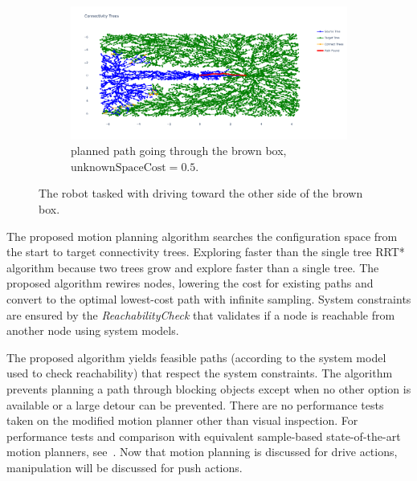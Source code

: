 \begin{figure}[H]
    \begin{subfigure}{1.11\textwidth}
    \centering
    \includegraphics[width=\textwidth]{figures/required_background/mp/mp_low_fixed_cost}
    \caption{planned path going through the brown box, $\textrm{unknownSpaceCost} = 0.5$.}
    \end{subfigure}
    \caption{The robot tasked with driving toward the other side of the brown box.}%
    \label{fig:mp_push_or_drive}
\end{figure}


The  proposed motion planning algorithm searches the configuration space from the start to target connectivity trees. Exploring faster than the single tree \ac{RRT*} algorithm  because two trees grow and explore faster than a single tree. The proposed algorithm rewires nodes, lowering the cost for existing paths and convert to the optimal lowest-cost path with infinite sampling. System constraints are ensured by the \textit{ReachabilityCheck} that validates if a node is reachable from another node using system models.\bs


The proposed algorithm yields feasible paths (according to the system model used to check reachability) that respect the system constraints. The algorithm prevents planning a path through blocking objects except when no other option is available or a large detour can be prevented. There are no performance tests taken on the modified motion planner other than visual inspection.
For performance tests and comparison with equivalent sample-based state-of-the-art motion planners, see~\cite{chen_fast_2018}. Now that motion planning is discussed for drive actions, manipulation will be discussed for push actions.



